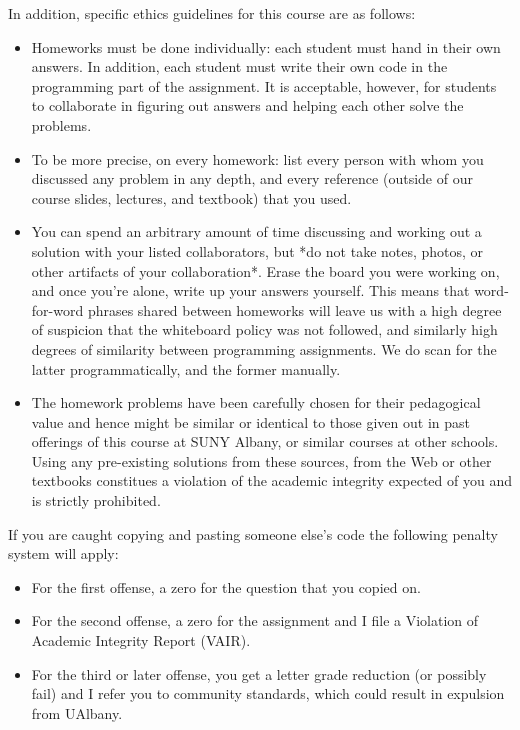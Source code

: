 \documentclass[a4paper,10pt]{article}
\begin{document}
In addition, specific ethics guidelines for this course are as follows: 
\begin{itemize}
\item Homeworks must be done individually: each student must hand in their own answers. In addition, each student must write their own code in the programming part of the assignment. It is acceptable, however, for students to collaborate in figuring out answers and helping each other solve the problems.

\item To be more precise, on every homework:
list every person with whom you discussed any problem in any depth, and every reference (outside of our course slides, lectures, and textbook) that you used.

\item You can spend an arbitrary amount of time discussing and working out a solution with your listed collaborators, but *do not take notes, photos, or other artifacts of your collaboration*. Erase the board you were working on, and once you're alone, write up your answers yourself.
This means that word-for-word phrases shared between homeworks will leave us with a high degree of suspicion that the whiteboard policy was not followed, and similarly high degrees of similarity between programming assignments. We do scan for the latter programmatically, and the former manually.

\item The homework problems have been carefully chosen for their pedagogical value and hence might be similar or identical to those given out in past offerings of this course at SUNY Albany, or similar courses at other schools. Using any pre-existing solutions from these sources, from the Web or other textbooks constitues a violation of the academic integrity expected of you and is strictly prohibited.
\end{itemize}

If you are caught copying and pasting someone else’s code the following penalty system will apply:
\begin{itemize}
\item For the first offense, a zero for the question that you copied on.
\item For the second offense, a zero for the assignment and I file a Violation of Academic Integrity Report (VAIR).
\item For the third or later offense, you get a letter grade reduction (or possibly fail) and I refer you to community standards, which could result in expulsion from UAlbany.
\end{itemize}
\end{document}
